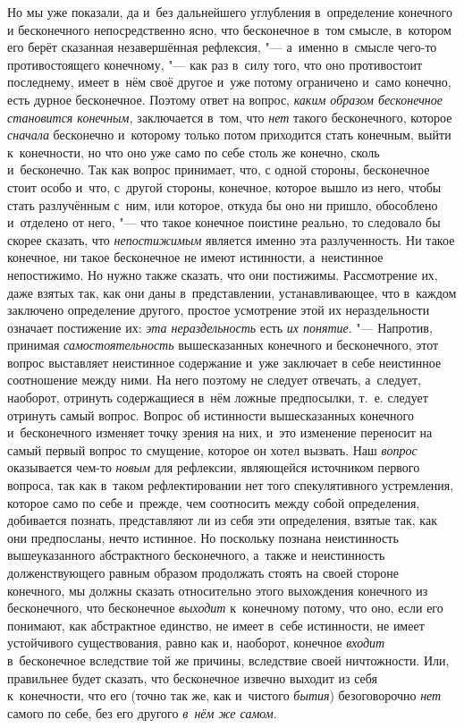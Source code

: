 Но мы уже
показали, да и~без дальнейшего углубления в~определение конечного и
бесконечного непосредственно ясно, что бесконечное в~том смысле, в~котором
его берёт сказанная незавершённая рефлексия, "--- а~именно в~смысле чего-то
противостоящего конечному, "--- как раз в~силу того, что оно противостоит
последнему, имеет в~нём своё другое и~уже потому ограничено и~само конечно,
есть дурное бесконечное. Поэтому ответ на вопрос,
{\em каким образом бесконечное становится конечным,}
заключается в~том, что {\em нет} такого бесконечного,
которое {\em сначала} бесконечно и~которому только
потом приходится стать конечным, выйти к~конечности, но что оно уже само по
себе столь же конечно, сколь и~бесконечно. Так как вопрос принимает, что, с
одной стороны, бесконечное стоит особо и~что, с~другой стороны, конечное,
которое вышло из него, чтобы стать разлучённым с~ним, или которое, откуда
бы оно ни пришло, обособлено и~отделено от него, "--- что такое конечное
поистине реально, то следовало бы скорее сказать, что
{\em непостижимым} является именно эта разлученность.
Ни такое конечное, ни такое бесконечное не имеют истинности, а~неистинное
непостижимо. Но нужно также сказать, что они
постижимы. Рассмотрение их, даже взятых так, как
они даны в~представлении, устанавливающее, что в~каждом заключено
определение другого, простое усмотрение этой их нераздельности означает
постижение их: {\em эта нераздельность} есть
{\em их понятие}. "--- Напротив, принимая
{\em самостоятельность} вышесказанных конечного и
бесконечного, этот вопрос выставляет неистинное содержание и~уже заключает
в себе неистинное соотношение между ними. На него поэтому не следует
отвечать, а~следует, наоборот, отринуть содержащиеся в~нём ложные
предпосылки, т.~е. следует отринуть самый вопрос. Вопрос об истинности
вышесказанных конечного и~бесконечного изменяет точку зрения на них, и~это
изменение переносит на самый первый вопрос то смущение, которое он хотел
вызвать. Наш {\em вопрос} оказывается чем-то
{\em новым} для рефлексии, являющейся источником
первого вопроса, так как в~таком рефлектировании нет того спекулятивного
устремления, которое само по себе и~прежде, чем соотносить между собой
определения, добивается познать, представляют ли из себя эти определения,
взятые так, как они предпосланы, нечто истинное. Но поскольку познана
неистинность вышеуказанного абстрактного бесконечного, а~также и
неистинность долженствующего равным образом продолжать стоять на своей
стороне конечного, мы должны сказать относительно этого выхождения
конечного из бесконечного, что бесконечное
{\em выходит} к~конечному потому, что оно, если его
понимают, как абстрактное единство, не имеет в~себе истинности, не имеет
устойчивого существования, равно как и, наоборот, конечное
{\em входит} в~бесконечное вследствие той же причины,
вследствие своей ничтожности. Или, правильнее будет сказать, что
бесконечное извечно выходит из себя к~конечности, что его (точно так же,
как и~чистого {\em бытия}) безоговорочно
{\em нет} самого по себе, без его другого {\em в~нём же самом}.

